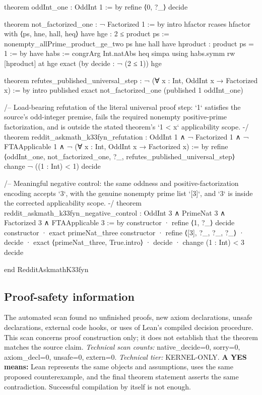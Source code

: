 \documentclass[11pt]{article}
\begin{document}
\begin{Vlean}
theorem oddInt_one : OddInt 1 := by
  refine ⟨0, ?_⟩
  decide

theorem not_factorized_one : ¬ Factorized 1 := by
  intro hfactor
  rcases hfactor with ⟨ps, hne, hall, heq⟩
  have hge : 2 ≤ product ps :=
    nonempty_allPrime_product_ge_two ps hne hall
  have hproduct : product ps = 1 := by
    have habs := congrArg Int.natAbs heq
    simpa using habs.symm
  rw [hproduct] at hge
  exact (by decide : ¬ (2 ≤ 1)) hge

theorem refutes_published_universal_step :
    ¬ (∀ x : Int, OddInt x → Factorized x) := by
  intro published
  exact not_factorized_one (published 1 oddInt_one)

/-- Load-bearing refutation of the literal universal proof step: `1` satisfies
the source's odd-integer premise, fails the required nonempty positive-prime
factorization, and is outside the stated theorem's `1 < x` applicability scope.
-/
theorem reddit_askmath_k33fyn_refutation :
    OddInt 1 ∧
    ¬ Factorized 1 ∧
    ¬ FTAApplicable 1 ∧
    ¬ (∀ x : Int, OddInt x → Factorized x) := by
  refine ⟨oddInt_one, not_factorized_one, ?_,
    refutes_published_universal_step⟩
  change ¬ ((1 : Int) < 1)
  decide

/-- Meaningful negative control: the same oddness and positive-factorization
encoding accepts `3`, with the genuine nonempty prime list `[3]`, and `3` is
inside the corrected applicability scope. -/
theorem reddit_askmath_k33fyn_negative_control :
    OddInt 3 ∧ PrimeNat 3 ∧ Factorized 3 ∧ FTAApplicable 3 := by
  constructor
  · refine ⟨1, ?_⟩
    decide
  constructor
  · exact primeNat_three
  constructor
  · refine ⟨[3], ?_, ?_, ?_⟩
    · decide
    · exact ⟨primeNat_three, True.intro⟩
    · decide
  · change (1 : Int) < 3
    decide

end RedditAskmathK33fyn

\end{Vlean}
\subsection*{Proof-safety information}
The automated scan found no unfinished proofs, new axiom declarations, unsafe declarations, external code hooks, or uses of Lean's compiled decision procedure. This scan concerns proof construction only; it does not establish that the theorem matches the source claim.
\textit{Technical scan counts:} native\_decide=0, sorry=0, axiom\_decl=0, unsafe=0, extern=0. \textit{Technical tier:} KERNEL-ONLY.
\textbf{A YES means:} Lean represents the same objects and assumptions, uses the same proposed counterexample, and the final theorem statement asserts the same contradiction. Successful compilation by itself is not enough.
\clearpage
\end{document}
